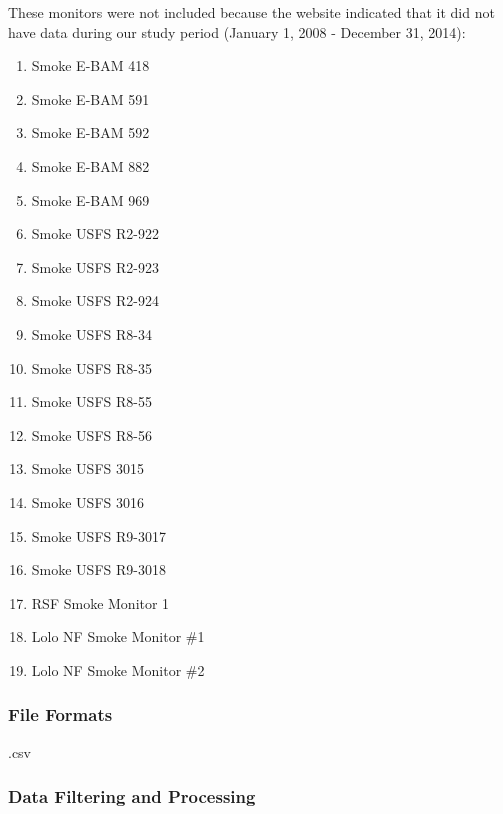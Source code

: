 % 
% 
% 
These monitors were not included because the website indicated that it did not have data during our study period (January 1, 2008 - December 31, 2014):
\begin{enumerate}[nolistsep]
\item Smoke E-BAM 418
\item Smoke E-BAM 591
\item Smoke E-BAM 592
\item Smoke E-BAM 882
\item Smoke E-BAM 969
\item Smoke USFS R2-922
\item Smoke USFS R2-923
\item Smoke USFS R2-924
\item Smoke USFS R8-34
\item Smoke USFS R8-35
\item Smoke USFS R8-55
\item Smoke USFS R8-56
\item Smoke USFS 3015
\item Smoke USFS 3016
\item Smoke USFS R9-3017
\item Smoke USFS R9-3018
\item RSF Smoke Monitor 1
\item Lolo NF Smoke Monitor \#1
\item Lolo NF Smoke Monitor \#2

\end{enumerate}

\subsubsection*{File Formats}
.csv

\subsubsection*{Data Filtering and Processing}

